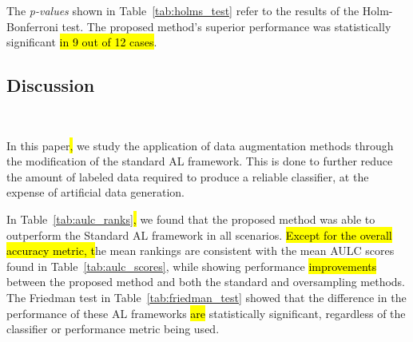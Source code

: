 \documentclass[preprint, 12pt]{elsarticle}
\begin{document}
\begin{table}
	\centering
    \caption{%
        Adjusted p-values using the Wilcoxon signed-rank method. Bold values
        are statistically significant at a level of $\alpha = 0.05$. The null
        hypothesis is that the performance of the proposed framework is
        similar to that of the oversampling or standard framework.
    }\label{tab:wilcoxon_test}
\end{table}

The \textit{p-values} shown in Table~\ref{tab:holms_test} refer to the results
of the Holm-Bonferroni test. The proposed method's superior performance was
statistically significant \hl{in 9 out of 12 cases}. 

\begin{table}
	\centering
    \caption{%
        Adjusted p-values using the Holm-Bonferroni method. Bold values are
        statistically significant at a level of $\alpha = 0.05$. The null
        hypothesis is that the Oversampling or Proposed method does not
        perform better than the control method (Standard AL framework).
    }\label{tab:holms_test}
\end{table}

\subsection{Discussion}~\label{sec:sub_discussion}

In this paper\hl{,} we study the application of data augmentation methods
through the modification of the standard AL framework. This is done to further
reduce the amount of labeled data required to produce a reliable classifier,
at the expense of artificial data generation.
 
In Table~\ref{tab:aulc_ranks}\hl{,} we found that the proposed method was able to
outperform the Standard AL framework in all scenarios. \hl{Except for
the overall accuracy metric, t}he mean rankings are consistent with the mean
AULC scores found in Table~\ref{tab:aulc_scores}, while showing performance
\hl{improvements} between the proposed method and both the standard and
oversampling methods. The Friedman test in Table~\ref{tab:friedman_test}
showed that the difference in the performance of these AL frameworks \hl{are}
statistically significant, regardless of the classifier or performance metric
being used.
 
\end{document}
